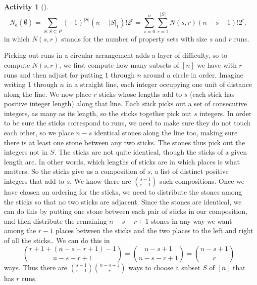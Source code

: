 \documentclass[10pt,]{book}
\theoremstyle{plain}
\theoremstyle{definition}
\newtheorem{activity}[project]{Activity}
\numberwithin{equation}{chapter}
\begin{document}
\begin{activity}[]
\begin{equation*}
N_{\mbox{e} }(\emptyset)=\sum_{S:S\subseteq P}(-1)^{|S|}(n-|S|_1)!2^r
=\sum_{s=0}^n\sum_{r=1}^{|S|}N(s,r)(n-s-1)!2^r,
\end{equation*}
in which \(N(s,r)\) stands for the number of property sets with size \(s\) and \(r\) runs.%
\par
Picking out runs in a circular arrangement adds a layer of difficulty, so to compute \(N(s,r)\), we first compute how many subsets of \([n]\) we have with \(r\) runs and then adjust for putting \(1\) through \(n\) around a circle in order.  Imagine writing 1 through \(n\) in a straight line, each integer occupying one unit of distance along the line. We now place \(r\) sticks whose lengths add to \(s\) (each stick has positive integer length) along that line. Each stick picks out a set of consecutive integers, as many as its length, so the sticks together pick out \(s\) integers. In order to be sure the sticks correspond to runs, we need to make sure they do not touch each other, so we place \(n-s\) identical stones along the line too, making sure there is at least one stone between any two sticks. The stones thus pick out the integers not in \(S\). The sticks are not quite identical, though the sticks of a given length are. In other words, which lengths of sticks are in which places is what matters. So the sticks give us a composition of \(s\), a list of distinct positive integers that add to \(s\). We know there are \(\binom{s-1}{r-1}\) such compositions. Once we have chosen an ordering for the sticks, we need to distribute the stones among the sticks so that no two sticks are adjacent.  Since the stones are identical, we can do this by putting one stone between each pair of sticks in our composition, and then distribute the remaining \(n-s-r+1\) stones in any way we want among the \(r-1\) places between the sticks and the two places to the left and right of all the sticks.. We can do this in%
\begin{equation*}
\binom{r+1 + (n-s-r+1)-1}{n-s-r+1}=\binom{n-s+1}{n-s-r+1}=\binom{n-s+1}{r}
\end{equation*}
ways. Thus there are \(\binom{s-1}{r-1}\binom{n-s+1}{r}\) ways to choose a subset \(S\) of \([n]\) that has \(r\) runs.%
\par

\end{activity}
\end{document}
